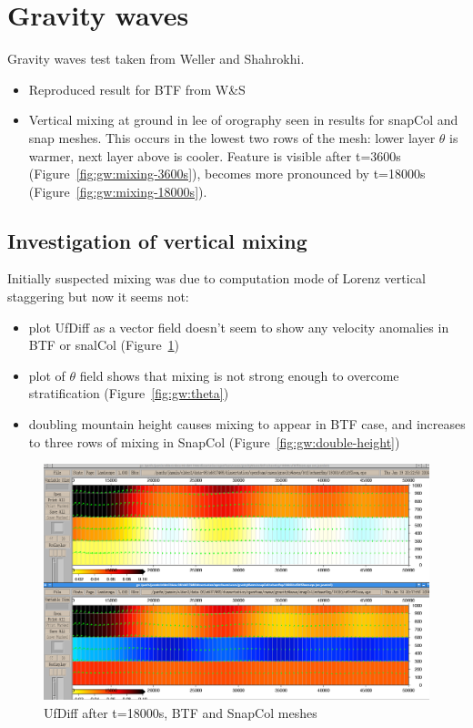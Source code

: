 \section{Gravity waves}

Gravity waves test taken from Weller and Shahrokhi.

\begin{itemize}
\item Reproduced result for BTF from W\&S
\item Vertical mixing at ground in lee of orography seen in results for snapCol and snap meshes.  This occurs in the lowest two rows of the mesh: lower layer $\theta$ is warmer, next layer above is cooler.  Feature is visible after t=3600s (Figure~\ref{fig:gw:mixing-3600s}), becomes more pronounced by t=18000s (Figure~\ref{fig:gw:mixing-18000s}).
\end{itemize}

\subsection{Investigation of vertical mixing}
Initially suspected mixing was due to computation mode of Lorenz vertical staggering but now it seems not:
\begin{itemize}
	\item plot UfDiff as a vector field doesn't seem to show any velocity anomalies in BTF or snalCol (Figure~\ref{fig:gw:ufdiff})
	\item plot of $\theta$ field shows that mixing is not strong enough to overcome stratification (Figure~\ref{fig:gw:theta})
	\item doubling mountain height causes mixing to appear in BTF case, and increases to three rows of mixing in SnapCol (Figure~\ref{fig:gw:double-height})
\end{itemize}

\begin{figure}
	\includegraphics[width=\textwidth]{interim-results/gravityWavesBTFSnapColVelocityVectors.png}
	\caption{UfDiff after t=18000s, BTF and SnapCol meshes}
	\label{fig:gw:ufdiff}
\end{figure}

